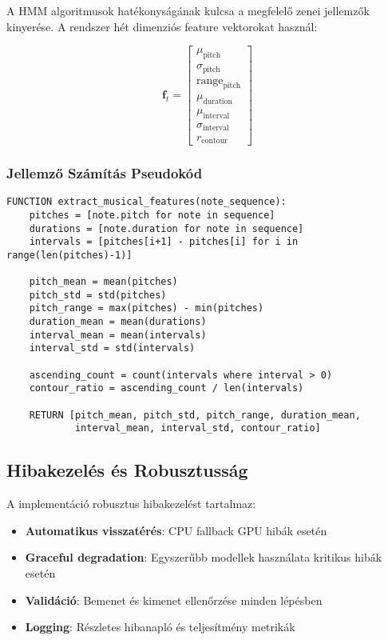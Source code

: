 A HMM algoritmusok hatékonyságának kulcsa a megfelelő zenei jellemzők kinyerése. A rendszer hét dimenziós feature vektorokat használ:

\begin{equation}
\mathbf{f}_t = \begin{bmatrix}
\mu_{\text{pitch}} \\
\sigma_{\text{pitch}} \\
\text{range}_{\text{pitch}} \\
\mu_{\text{duration}} \\
\mu_{\text{interval}} \\
\sigma_{\text{interval}} \\
r_{\text{contour}}
\end{bmatrix}
\end{equation}

\subsubsection{Jellemző Számítás Pseudokód}

\begin{verbatim}
FUNCTION extract_musical_features(note_sequence):
    pitches = [note.pitch for note in sequence]
    durations = [note.duration for note in sequence]
    intervals = [pitches[i+1] - pitches[i] for i in range(len(pitches)-1)]
    
    pitch_mean = mean(pitches)
    pitch_std = std(pitches)
    pitch_range = max(pitches) - min(pitches)
    duration_mean = mean(durations)
    interval_mean = mean(intervals)
    interval_std = std(intervals)
    
    ascending_count = count(intervals where interval > 0)
    contour_ratio = ascending_count / len(intervals)
    
    RETURN [pitch_mean, pitch_std, pitch_range, duration_mean, 
            interval_mean, interval_std, contour_ratio]
\end{verbatim}

\subsection{Hibakezelés és Robusztusság}

A implementáció robusztus hibakezelést tartalmaz:

\begin{itemize}
    \item \textbf{Automatikus visszatérés}: CPU fallback GPU hibák esetén
    \item \textbf{Graceful degradation}: Egyszerűbb modellek használata kritikus hibák esetén
    \item \textbf{Validáció}: Bemenet és kimenet ellenőrzése minden lépésben
    \item \textbf{Logging}: Részletes hibanapló és teljesítmény metrikák
\end{itemize}

